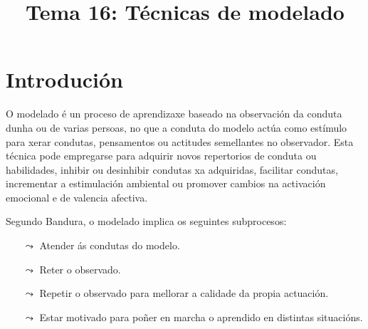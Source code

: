 \documentclass[a4paper,11pt]{article}
\title{Tema 16: Técnicas de modelado}
\date{}
\begin{document}
   

\maketitle 

\section{Introdución}
O modelado é un proceso de aprendizaxe baseado na observación da conduta dunha ou de varias persoas, no que a conduta do modelo actúa como estímulo para xerar condutas, pensamentos ou actitudes semellantes no observador. Esta técnica pode empregarse para adquirir novos repertorios de conduta ou habilidades, inhibir ou desinhibir condutas xa adquiridas, facilitar condutas, incrementar a estimulación ambiental ou promover cambios na activación emocional e de valencia afectiva.

Segundo Bandura, o modelado implica os seguintes subprocesos:
\begin{itemize}
	\item[$\leadsto$] Atender ás condutas do modelo.
	\item[$\leadsto$] Reter o observado.
	\item[$\leadsto$] Repetir o observado para mellorar a calidade da propia actuación.
	\item[$\leadsto$] Estar motivado para poñer en marcha o aprendido en distintas situacións.
\end{itemize}
\end{document}
